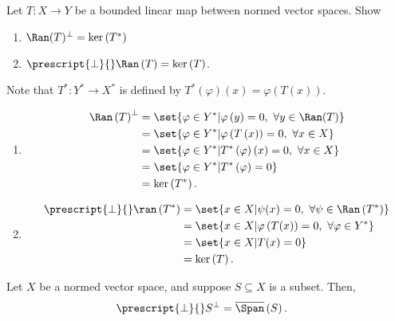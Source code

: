 \documentclass[10pt]{mypackage}
\begin{document}
  \begin{exercise}
    Let $T: X\rightarrow Y$ be a bounded linear map between normed vector spaces. Show
    \begin{enumerate}[(1)]
      \item $\Ran(T)^{\perp} = \ker\left(T^{\ast}\right)$
      \item $\prescript{\perp}{}\Ran\left(T\right) = \ker\left(T\right)$.
    \end{enumerate}
  \end{exercise}
  \begin{solution}
    Note that $T^{\ast}: Y^{\ast}\rightarrow X^{\ast}$ is defined by $T^{\ast}\left(\varphi\right)(x) = \varphi\left(T(x)\right)$.
    \begin{enumerate}[(1)]
      \item 
        \begin{align*}
          \Ran\left(T\right)^{\perp} &= \set{\varphi\in Y^{\ast}| \varphi\left(y\right) = 0,~\forall y\in \Ran(T)}\\
                                     &= \set{\varphi\in Y^{\ast}| \varphi\left(T\left(x\right)\right) = 0,~\forall x\in X}\\
                                     &= \set{\varphi\in Y^{\ast}| T^{\ast}\left(\varphi\right)(x) = 0,~\forall x\in X}\\
                                     &= \set{\varphi\in Y^{\ast}| T^{\ast}\left(\varphi\right) = 0}\\
                                     &= \ker\left(T^{\ast}\right).
        \end{align*}
      \item 
        \begin{align*}
          \prescript{\perp}{}\ran\left(T^{\ast}\right) &= \set{x\in X| \psi(x) = 0,~\forall \psi\in \Ran\left(T^{\ast}\right)}\\
                                            &= \set{x\in X| \varphi\left(T(x)\right) = 0,~\forall \varphi\in Y^{\ast}}\\
                                            &= \set{x\in X| T(x) = 0}\\
                                            &= \ker\left(T\right).
        \end{align*}
    \end{enumerate}
  \end{solution}
  \begin{corollary}
    Let $X$ be a normed vector space, and suppose $S\subseteq X$ is a subset. Then,
    \begin{align*}
      \prescript{\perp}{}S^{\perp} &= \overline{\Span}\left(S\right).
    \end{align*}
    
  \end{corollary}
\end{document}
